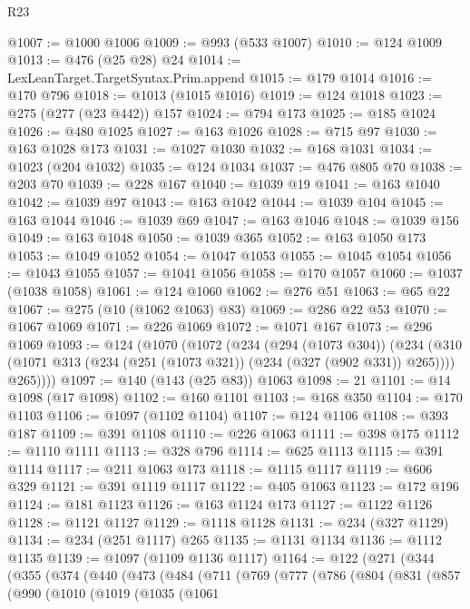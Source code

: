 \begin{lexlean}{R23}
\begin{coremodule}
@1007 := @1000 @1006
@1009 := @993 (@533 @1007)
@1010 := @124 @1009
@1013 := @476 (@25 @28) @24
@1014 := LexLeanTarget.TargetSyntax.Prim.append
@1015 := @179 @1014
@1016 := @170 @796
@1018 := @1013 (@1015 @1016)
@1019 := @124 @1018
@1023 := @275 (@277 (@23 @442)) @157
@1024 := @794 @173
@1025 := @185 @1024
@1026 := @480 @1025
@1027 := @163 @1026
@1028 := @715 @97
@1030 := @163 @1028 @173
@1031 := @1027 @1030
@1032 := @168 @1031
@1034 := @1023 (@204 @1032)
@1035 := @124 @1034
@1037 := @476 @805 @70
@1038 := @203 @70
@1039 := @228 @167
@1040 := @1039 @19
@1041 := @163 @1040
@1042 := @1039 @97
@1043 := @163 @1042
@1044 := @1039 @104
@1045 := @163 @1044
@1046 := @1039 @69
@1047 := @163 @1046
@1048 := @1039 @156
@1049 := @163 @1048
@1050 := @1039 @365
@1052 := @163 @1050 @173
@1053 := @1049 @1052
@1054 := @1047 @1053
@1055 := @1045 @1054
@1056 := @1043 @1055
@1057 := @1041 @1056
@1058 := @170 @1057
@1060 := @1037 (@1038 @1058)
@1061 := @124 @1060
@1062 := @276 @51
@1063 := @65 @22
@1067 := @275 (@10 (@1062 @1063) @83)
@1069 := @286 @22 @53
@1070 := @1067 @1069
@1071 := @226 @1069
@1072 := @1071 @167
@1073 := @296 @1069
@1093 := @124
    (@1070
      (@1072
        (@234
          (@294 (@1073 @304))
          (@234
            (@310 (@1071 @313 (@234 (@251 (@1073 @321)) (@234 (@327 (@902 @331)) @265))))
            @265))))
@1097 := @140 (@143 (@25 @83)) @1063
@1098 := 21
@1101 := @14 @1098 (@17 @1098)
@1102 := @160 @1101
@1103 := @168 @350
@1104 := @170 @1103
@1106 := @1097 (@1102 @1104)
@1107 := @124 @1106
@1108 := @393 @187
@1109 := @391 @1108
@1110 := @226 @1063
@1111 := @398 @175
@1112 := @1110 @1111
@1113 := @328 @796
@1114 := @625 @1113
@1115 := @391 @1114
@1117 := @211 @1063 @173
@1118 := @1115 @1117
@1119 := @606 @329
@1121 := @391 @1119 @1117
@1122 := @405 @1063
@1123 := @172 @196
@1124 := @181 @1123
@1126 := @163 @1124 @173
@1127 := @1122 @1126
@1128 := @1121 @1127
@1129 := @1118 @1128
@1131 := @234 (@327 @1129)
@1134 := @234 (@251 @1117) @265
@1135 := @1131 @1134
@1136 := @1112 @1135
@1139 := @1097 (@1109 @1136 @1117)
@1164 := @122
    (@271
      (@344
        (@355
          (@374
            (@440
              (@473
                (@484
                  (@711
                    (@769
                      (@777
                        (@786
                          (@804
                            (@831
                              (@857
                                (@990
                                  (@1010
                                    (@1019
                                      (@1035
                                        (@1061

\end{coremodule}
\end{lexlean}
